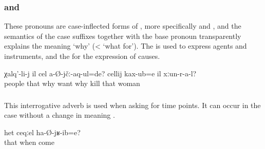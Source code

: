 
\subsubsection{ and  }
\label{sssec:cel and celij why}

These pronouns are case-inflected forms of  , more specifically   and  , and the semantics of the case suffixes together with the base pronoun transparently explains the meaning `why' (< `what for'). The  is used to express agents and instruments, and the  for the expression of causes.
%
\begin{exe}
	\ex	\label{ex:Why did the people not love him? Why did the women kill him}
	\gll	χalq'-li-j	il	cel	a-Ø-jčː-aq-ul=de?	cellij	kax-ub=e	il xːun-r-a-l?\\
		people	that	why	want	why	kill	that	woman\\
	\glt	{}
\end{exe}



\subsubsection{ }
\label{sssec:ceqel when}

This interrogative adverb is used when asking for time points. It can occur in the  case without a change in meaning .
%
\begin{exe}
	\ex	\label{ex:When did he come}
	\gll	het	ceqːel	ha-Ø-jʁ-ib=e?\\
		that	when	come\\
	\glt	{}
\end{exe}
%

